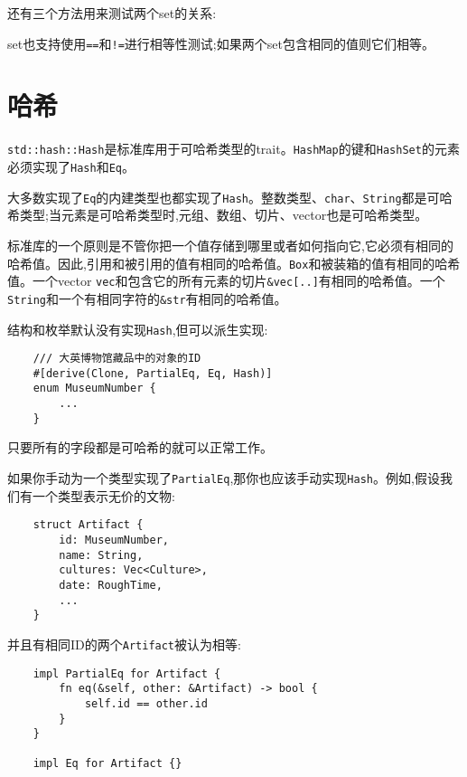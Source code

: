 还有三个方法用来测试两个set的关系:




set也支持使用\texttt{==}和\texttt{!=}进行相等性测试;如果两个set包含相同的值则它们相等。

\section{哈希}

\texttt{std::hash::Hash}是标准库用于可哈希类型的trait。\texttt{HashMap}的键和\texttt{HashSet}的元素必须实现了\texttt{Hash}和\texttt{Eq}。

大多数实现了\texttt{Eq}的内建类型也都实现了\texttt{Hash}。整数类型、\texttt{char}、\texttt{String}都是可哈希类型;当元素是可哈希类型时,元组、数组、切片、vector也是可哈希类型。

标准库的一个原则是不管你把一个值存储到哪里或者如何指向它,它必须有相同的哈希值。因此,引用和被引用的值有相同的哈希值。\texttt{Box}和被装箱的值有相同的哈希值。一个vector \texttt{vec}和包含它的所有元素的切片\texttt{\&vec[..]}有相同的哈希值。一个\texttt{String}和一个有相同字符的\texttt{\&str}有相同的哈希值。

结构和枚举默认没有实现\texttt{Hash},但可以派生实现:
\begin{verbatim}
    /// 大英博物馆藏品中的对象的ID
    #[derive(Clone, PartialEq, Eq, Hash)]
    enum MuseumNumber {
        ...
    }
\end{verbatim}
只要所有的字段都是可哈希的就可以正常工作。

如果你手动为一个类型实现了\texttt{PartialEq},那你也应该手动实现\texttt{Hash}。例如,假设我们有一个类型表示无价的文物:
\begin{verbatim}
    struct Artifact {
        id: MuseumNumber,
        name: String,
        cultures: Vec<Culture>,
        date: RoughTime,
        ...
    }
\end{verbatim}

并且有相同ID的两个\texttt{Artifact}被认为相等:
\begin{verbatim}
    impl PartialEq for Artifact {
        fn eq(&self, other: &Artifact) -> bool {
            self.id == other.id
        }
    }

    impl Eq for Artifact {}
\end{verbatim}


